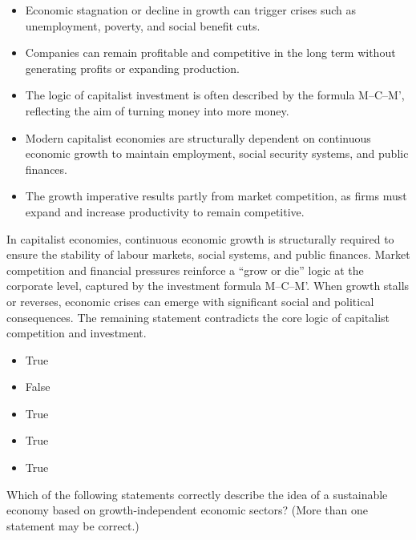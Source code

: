 \documentclass[
  a4paper,
  DIV=11,
  numbers=noendperiod,
  oneside,
  openany]{scrreprt}
\providecommand{\tightlist}{%
  \setlength{\itemsep}{0pt}\setlength{\parskip}{0pt}}
\begin{document}
\begin{itemize}
\tightlist
\item[$\square$]
  Economic stagnation or decline in growth can trigger crises such as
  unemployment, poverty, and social benefit cuts.
\item[$\square$]
  Companies can remain profitable and competitive in the long term
  without generating profits or expanding production.
\item[$\square$]
  The logic of capitalist investment is often described by the formula
  M--C--M', reflecting the aim of turning money into more money.
\item[$\square$]
  Modern capitalist economies are structurally dependent on continuous
  economic growth to maintain employment, social security systems, and
  public finances.
\item[$\square$]
  The growth imperative results partly from market competition, as firms
  must expand and increase productivity to remain competitive.
\end{itemize}

In capitalist economies, continuous economic growth is structurally
required to ensure the stability of labour markets, social systems, and
public finances. Market competition and financial pressures reinforce a
``grow or die'' logic at the corporate level, captured by the investment
formula M--C--M'. When growth stalls or reverses, economic crises can
emerge with significant social and political consequences. The remaining
statement contradicts the core logic of capitalist competition and
investment.

\begin{itemize}
\tightlist
\item
  True
\item
  False
\item
  True
\item
  True
\item
  True
\end{itemize}

Which of the following statements correctly describe the idea of a
sustainable economy based on growth-independent economic sectors? (More
than one statement may be correct.)
\end{document}
